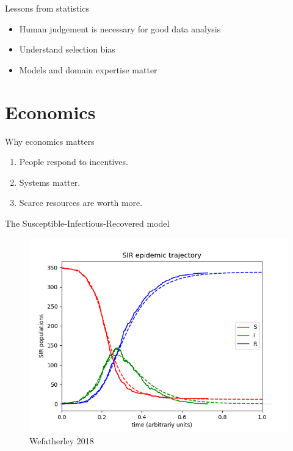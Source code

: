 \documentclass[ignorenonframetext,aspectratio=54,]{beamer}
\providecommand{\tightlist}{%
  \setlength{\itemsep}{0pt}\setlength{\parskip}{0pt}}
\begin{document}
\begin{frame}{Lessons from statistics}
\protect\hypertarget{lessons-from-statistics}{}

\begin{itemize}
\tightlist
\item
  Human judgement is necessary for good data analysis
\item
  Understand selection bias
\item
  Models and domain expertise matter
\end{itemize}

\end{frame}

\hypertarget{economics}{%
\section{Economics}\label{economics}}

\begin{frame}{Why economics matters}
\protect\hypertarget{why-economics-matters}{}

\begin{enumerate}
\tightlist
\item
  People respond to incentives.
\item
  Systems matter.
\item
  Scarce resources are worth more.
\end{enumerate}

\end{frame}

\begin{frame}{The Susceptible-Infectious-Recovered model}
\protect\hypertarget{the-susceptible-infectious-recovered-model}{}

\begin{figure}
\centering
\includegraphics[width=\textwidth,height=0.8\textheight]{exhibit/fig/SIR_trajectory.png}
\caption{Wefatherley 2018}
\end{figure}

\end{frame}
\end{document}
